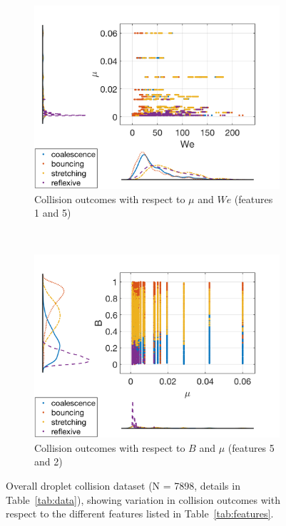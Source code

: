 \documentclass{article}
\begin{document}
\begin{figure}[h!]
\begin{subfigure}[b]{0.4\textwidth}
        \label{fig:data2}
    \end{subfigure}
    ~ %
    \begin{subfigure}[b]{0.4\textwidth}
        \includegraphics[width=\textwidth]{../figures/data_scatterhist3.png}
        \caption{\centering Collision outcomes with respect to $\mu$ and $We$ (features 1 and 5)}
        \label{fig:data3}
    \end{subfigure}
        ~ %
    \begin{subfigure}[b]{0.4\textwidth}
        \includegraphics[width=\textwidth]{../figures/data_scatterhist4.png}
        \caption{\centering Collision outcomes with respect to $B$ and $\mu$ (features 5 and 2)}
        \label{fig:data4}
    \end{subfigure}
    	\caption{Overall droplet collision dataset (N = 7898, details in Table~\ref{tab:data}), showing variation in collision outcomes with respect to the different features listed in Table~\ref{tab:features}.} \label{fig:animals}
\end{figure}
\end{document}

